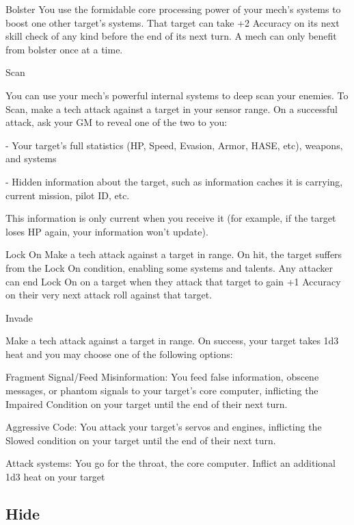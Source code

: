 Bolster
You use the formidable core processing power of your mech’s systems to boost one other
target’s systems. That target can take +2 Accuracy on its next skill check of any kind before the
end of its next turn. A mech can only benefit from bolster once at a time.


Scan

You can use your mech’s powerful internal systems to deep scan your enemies.
To Scan, make a tech attack against a target in your sensor range. On a successful attack, ask
your GM to reveal one of the two to you:

             -   Your target’s full statistics (HP, Speed, Evasion, Armor, HASE, etc), weapons, and
                 systems

             -   Hidden information about the target, such as information caches it is carrying,
                 current mission, pilot ID, etc.

This information is only current when you receive it (for example, if the target loses HP again,
your information won’t update).


Lock On
Make a tech attack against a target in range. On hit, the target suffers from the Lock On
condition, enabling some systems and talents. Any attacker can end Lock On on a target when
they attack that target to gain +1 Accuracy on their very next attack roll against that target.


Invade

Make a tech attack against a target in range. On success, your target takes 1d3 heat and you
may choose one of the following options:





         Fragment Signal/Feed Misinformation: You feed false information, obscene messages,
         or phantom signals to your target’s core computer, inflicting the Impaired Condition on
         your target until the end of their next turn.


         Aggressive Code: You attack your target’s servos and engines, inflicting the Slowed
         condition on your target until the end of their next turn.


         Attack systems: You go for the throat, the core computer. Inflict an additional 1d3 heat
         on your target

\subsection{Hide}

